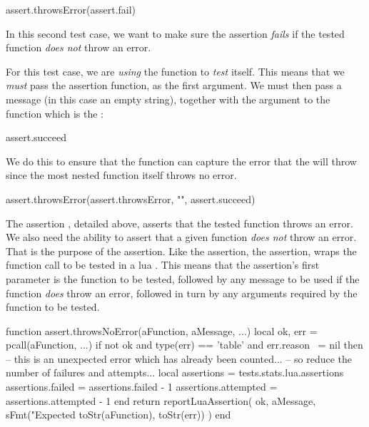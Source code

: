 \startLuaTest
  assert.throwsError(assert.fail)
\stopLuaTest
\stopTestCase


In this second test case, we want to make sure the assertion \emph{fails} 
if the tested function \emph{does not} throw an error.

For this test case, we are \emph{using} the  
function to \emph{test} itself. This means that we \emph{must} pass the 
assertion function,  as the first argument. We 
must then pass a message (in this case an empty string), together with the 
argument to the   function which is 
the : 

\starttyping[option=lua]
  assert.succeed
\stoptyping

\noindent We do this to ensure that the  
 function can capture the error that the 
  will throw since the most 
 nested function itself throws no error. 

\startLuaTest
  assert.throwsError(assert.throwsError, "", assert.succeed)
\stopLuaTest
\stopTestCase

\stopTestSuite


The assertion , detailed above, asserts that the 
tested function throws an error. We also need the ability to assert that a 
given function \emph{does not} throw an error. That is the purpose of the 
 assertion. Like the  
assertion, the  assertion, wraps the function 
call to be tested in a lua . This means that the 
 assertion's first parameter is the function to 
be tested, followed by any message to be used if the function \emph{does} 
throw an error, followed in turn by any arguments required by the function 
to be tested. 

\startLuaCode
function assert.throwsNoError(aFunction, aMessage, ...)
  local ok, err = pcall(aFunction, ...)
  if not ok and type(err) == 'table' and err.reason ~= nil then
    -- this is an unexpected error which has already been counted...
    -- so reduce the number of failures and attempts...
    local assertions = tests.stats.lua.assertions
    assertions.failed    = assertions.failed    - 1
    assertions.attempted = assertions.attempted - 1
  end
  return reportLuaAssertion(
    ok,
    aMessage,
    sFmt("Expected %
      toStr(aFunction), toStr(err))
  )
end
\stopLuaCode


